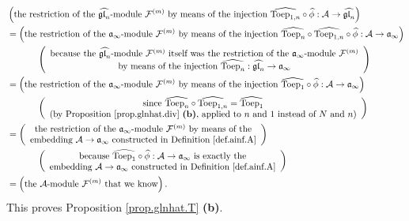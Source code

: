 \documentclass[etingof-lie.tex]{subfiles}
\begin{document}
\begin{align*}
&  \left(  \text{the restriction of the }\widehat{\mathfrak{gl}_{n}%
}\text{-module }\mathcal{F}^{\left(  m\right)  }\text{ by means of the
injection }\widehat{\operatorname*{Toep}\nolimits_{1,n}}\circ\widehat{\phi
}:\mathcal{A}\rightarrow\widehat{\mathfrak{gl}_{n}}\right) \\
&  =\left(  \text{the restriction of the }\mathfrak{a}_{\infty}\text{-module
}\mathcal{F}^{\left(  m\right)  }\text{ by means of the injection
}\widehat{\operatorname*{Toep}\nolimits_{n}}\circ\widehat{\operatorname*{Toep}%
\nolimits_{1,n}}\circ\widehat{\phi}:\mathcal{A}\rightarrow\mathfrak{a}%
_{\infty}\right) \\
&  \ \ \ \ \ \ \ \ \ \ \left(
\begin{array}
[c]{c}%
\text{because the }\widehat{\mathfrak{gl}_{n}}\text{-module }\mathcal{F}%
^{\left(  m\right)  }\text{ itself was the restriction of the }\mathfrak{a}%
_{\infty}\text{-module }\mathcal{F}^{\left(  m\right)  }\\
\text{by means of the injection }\widehat{\operatorname*{Toep}\nolimits_{n}%
}:\widehat{\mathfrak{gl}_{n}}\rightarrow\mathfrak{a}_{\infty}%
\end{array}
\right) \\
&  =\left(  \text{the restriction of the }\mathfrak{a}_{\infty}\text{-module
}\mathcal{F}^{\left(  m\right)  }\text{ by means of the injection
}\widehat{\operatorname*{Toep}\nolimits_{1}}\circ\widehat{\phi}:\mathcal{A}%
\rightarrow\mathfrak{a}_{\infty}\right) \\
&  \ \ \ \ \ \ \ \ \ \ \left(
\begin{array}
[c]{c}%
\text{since }\widehat{\operatorname*{Toep}\nolimits_{n}}\circ
\widehat{\operatorname*{Toep}\nolimits_{1,n}}=\widehat{\operatorname*{Toep}%
\nolimits_{1}}\\
\text{(by Proposition \ref{prop.glnhat.div} \textbf{(b)}, applied to }n\text{
and }1\text{ instead of }N\text{ and }n\text{)}%
\end{array}
\right) \\
&  =\left(
\begin{array}
[c]{c}%
\text{the restriction of the }\mathfrak{a}_{\infty}\text{-module }%
\mathcal{F}^{\left(  m\right)  }\text{ by means of the}\\
\text{embedding }\mathcal{A}\rightarrow\mathfrak{a}_{\infty}\text{ constructed
in Definition \ref{def.ainf.A}}%
\end{array}
\right) \\
&  \ \ \ \ \ \ \ \ \ \ \left(
\begin{array}
[c]{c}%
\text{because }\widehat{\operatorname*{Toep}\nolimits_{1}}\circ\widehat{\phi
}:\mathcal{A}\rightarrow\mathfrak{a}_{\infty}\text{ is exactly the}\\
\text{embedding }\mathcal{A}\rightarrow\mathfrak{a}_{\infty}\text{ constructed
in Definition \ref{def.ainf.A}}%
\end{array}
\right) \\
&  =\left(  \text{the }\mathcal{A}\text{-module }\mathcal{F}^{\left(
m\right)  }\text{ that we know}\right)  .
\end{align*}
This proves Proposition \ref{prop.glnhat.T} \textbf{(b)}.
\end{document}
